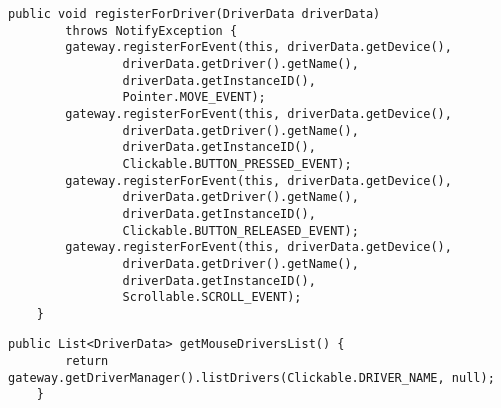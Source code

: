 \begin{lstlisting}[frame=single]
	public void registerForDriver(DriverData driverData)
		throws NotifyException {
		gateway.registerForEvent(this, driverData.getDevice(),
				driverData.getDriver().getName(),
				driverData.getInstanceID(), 
				Pointer.MOVE_EVENT);
		gateway.registerForEvent(this, driverData.getDevice(),
				driverData.getDriver().getName(),
				driverData.getInstanceID(), 
				Clickable.BUTTON_PRESSED_EVENT);
		gateway.registerForEvent(this, driverData.getDevice(),
				driverData.getDriver().getName(),
				driverData.getInstanceID(), 
				Clickable.BUTTON_RELEASED_EVENT);
		gateway.registerForEvent(this, driverData.getDevice(),
				driverData.getDriver().getName(),
				driverData.getInstanceID(), 
				Scrollable.SCROLL_EVENT);
	}
\end{lstlisting}

\begin{lstlisting}[frame=single]
	public List<DriverData> getMouseDriversList() {
		return gateway.getDriverManager().listDrivers(Clickable.DRIVER_NAME, null);
	}
\end{lstlisting}
